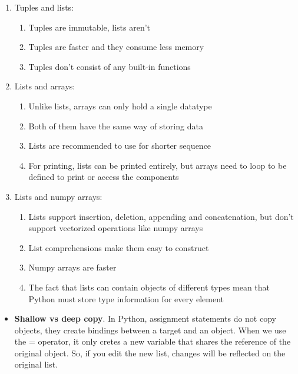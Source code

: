\documentclass[
  letterpaper,
  DIV=11,
  numbers=noendperiod]{scrreprt}
\providecommand{\tightlist}{%
  \setlength{\itemsep}{0pt}\setlength{\parskip}{0pt}}\usepackage{longtable,booktabs,array}
\begin{document}
\begin{enumerate}
\def\labelenumi{\arabic{enumi})}
\tightlist
\item
  Tuples and lists:

  \begin{enumerate}
  \def\labelenumii{\alph{enumii})}
  \tightlist
  \item
    Tuples are immutable, lists aren't
  \item
    Tuples are faster and they consume less memory
  \item
    Tuples don't consist of any built-in functions
  \end{enumerate}
\item
  Lists and arrays:

  \begin{enumerate}
  \def\labelenumii{\alph{enumii})}
  \tightlist
  \item
    Unlike lists, arrays can only hold a single datatype
  \item
    Both of them have the same way of storing data
  \item
    Lists are recommended to use for shorter sequence
  \item
    For printing, lists can be printed entirely, but arrays need to loop
    to be defined to print or access the components
  \end{enumerate}
\item
  Lists and numpy arrays:

  \begin{enumerate}
  \def\labelenumii{\alph{enumii})}
  \tightlist
  \item
    Lists support insertion, deletion, appending and concatenation, but
    don't support vectorized operations like numpy arrays
  \item
    List comprehensions make them easy to construct
  \item
    Numpy arrays are faster
  \item
    The fact that lists can contain objects of different types mean that
    Python must store type information for every element
  \end{enumerate}
\end{enumerate}

\begin{itemize}
\tightlist
\item
  \textbf{Shallow vs deep copy}. In Python, assignment statements do not
  copy objects, they create bindings between a target and an object.
  When we use the = operator, it only cretes a new variable that shares
  the reference of the original object. So, if you edit the new list,
  changes will be reflected on the original list.
\end{itemize}
\end{document}
